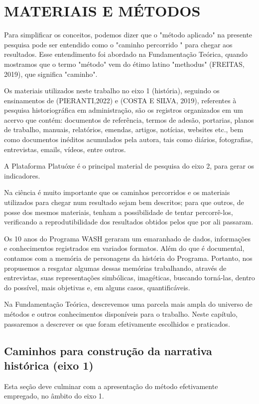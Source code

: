 \chapter[MATERIAIS E MÉTODOS]{MATERIAIS E MÉTODOS}\label{MATERIAIS E MÉTODOS}
Para simplificar os conceitos, podemos dizer que o "método aplicado" na presente pesquisa pode ser entendido como o "caminho percorrido " para chegar aos resultados. Esse entendimento  foi abordado  na Fundamentação Teórica, quando mostramos que o termo "método" vem do étimo latino "methodus" (FREITAS, 2019), que significa "caminho".

Os materiais utilizados neste trabalho no eixo 1 (história), seguindo os ensinamentos de (PIERANTI,2022) e (COSTA E SILVA, 2019), referentes à pesquisa historiográfica em administração,  são os registros organizados em um acervo que contém: documentos de referência, termos de adesão, portarias, planos de trabalho, manuais, relatórios, emendas, artigos, notícias, websites etc., bem como documentos inéditos acumulados pela autora, tais como diários, fotografias, entrevistas, emails, vídeos, entre outros.

A Plataforma Platuóxe é o principal material de pesquisa do eixo 2, para gerar os indicadores.

Na ciência é muito importante que os caminhos percorridos e os materiais utilizados para chegar num resultado sejam bem descritos; para que outros, de posse dos mesmos materiais, tenham a possibilidade de tentar percorrê-los, verificando a reprodutibilidade dos resultados obtidos pelos que por ali passaram.

Os 10 anos do Programa WASH geraram um emaranhado de dados, informações e conhecimentos registrados em variados formatos. Além do que é documental, contamos com a memória de personagens da história do Programa. Portanto, nos propusemos a resgatar algumas dessas memórias trabalhando, através de entrevistas, suas representações simbólicas, imagéticas, buscando torná-las, dentro do possível, mais objetivas e, em alguns casos, quantificáveis.

Na Fundamentação Teórica, descrevemos uma parcela mais ampla do universo de métodos e outros conhecimentos disponíveis para o trabalho. Neste capítulo, passaremos a descrever os que foram efetivamente escolhidos e praticados.

\section[Caminhos para construção da narrativa histórica (eixo 1)]{Caminhos para construção da narrativa histórica (eixo 1)}\label{Caminhos para construção da narrativa histórica (eixo 1)}
Esta seção deve culminar com a apresentação do método efetivamente empregado, no âmbito do eixo 1.

